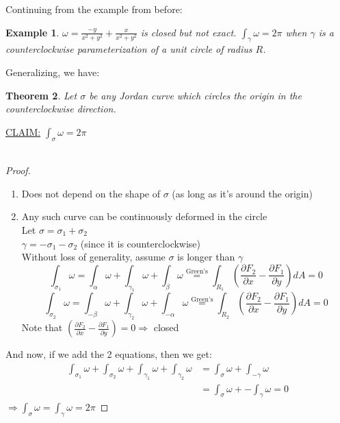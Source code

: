 \documentclass[12pt]{article}
\theoremstyle{plain}
\newtheorem{theorem}{Theorem}[section]
\newtheorem{example}[theorem]{Example}
\theoremstyle{definition}
\begin{document}
Continuing from the example from before:

\begin{example}
	$\omega = \frac{-y}{x^2+y^2} + \frac{x}{x^2+y^2}$ is closed but not exact. $\int_\gamma \omega = 2\pi$ when $\gamma$ is a counterclockwise parameterization of a unit circle of radius $R$.
\end{example}

	Generalizing, we have:
	\begin{theorem}
		Let $\sigma$ be any Jordan curve which circles the origin in the counterclockwise direction.
	\end{theorem}
	\underline{CLAIM:} $\int_\sigma \omega = 2\pi$\\
	\\
	\begin{proof}
		\begin{enumerate}
			\item{Does not depend on the shape of $\sigma$ (as long as it's around the origin)}
			\item{
			Any such curve can be continuously deformed in the circle\\
			Let $\sigma = \sigma_1 + \sigma_2$\\
			$\gamma = -\sigma_1 - \sigma_2$ (since it is counterclockwise)\\
			Without loss of generality, assume $\sigma$ is longer than $\gamma$\\
			$$\int_{\sigma_1} \omega = \int_\alpha \omega + \int_{\gamma_1} \omega + \int_{\beta} \omega \overset{\text{Green's}}{=} \int_{R_1} (\frac{\partial F_2}{\partial x} - \frac{\partial F_1}{\partial y}) dA = 0$$
			$$\int_{\sigma_2} \omega = \int_{-\beta} \omega + \int_{\gamma_2} \omega + \int_{-\alpha} \omega \overset{\text{Green's}}{=} \int_{R_2} (\frac{\partial F_2}{\partial x} - \frac{\partial F_1}{\partial y}) dA = 0$$
			Note that $(\frac{\partial F_2}{\partial x} - \frac{\partial F_1}{\partial y}) = 0 \Longrightarrow$ closed
			}
		\end{enumerate}
		And now, if we add the 2 equations, then we get:
		\begin{align*}
			\int_{\sigma_1} \omega + \int_{\sigma_2} \omega + \int_{\gamma_1} \omega + \int_{\gamma_2} \omega &= \int_\sigma \omega + \int_{-\gamma} \omega\\
			&= \int_\sigma \omega + -\int_{\gamma} \omega = 0
		\end{align*}
		$\Longrightarrow \int_\sigma \omega = \int_{\gamma} \omega = 2\pi$
	\end{proof}
\end{document}

